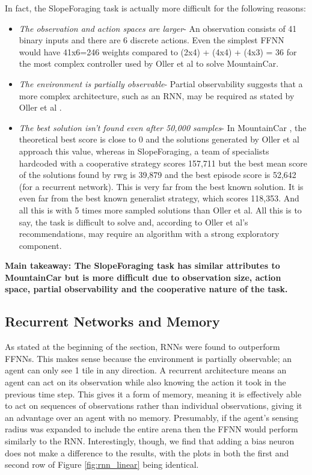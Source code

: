 \documentclass[12pt]{article}
\begin{document}
In fact, the SlopeForaging task is actually more difficult for the following reasons:

\begin{itemize}
\item \textit{The observation and action spaces are larger}- An observation consists of 41 binary inputs and there are 6 discrete actions. 
Even the simplest FFNN would have 41x6=246 weights compared to (2x4) + (4x4) + (4x3) = 36 for the most complex controller used by Oller et al to solve MountainCar. 

\item \textit{The environment is partially observable}- Partial observability suggests that a more complex architecture, such as an RNN, may be required as stated by Oller et al \cite{oller:AAMAS:2020}.

\item \textit{The best solution isn't found even after 50,000 samples}- In MountainCar \cite{MountainCar}, the theoretical best score is close to 0 and the solutions generated by Oller et al approach this value, whereas in SlopeForaging, a team of specialists hardcoded with a cooperative strategy scores 157,711 but the best mean score of the solutions found by rwg is 39,879 and the best episode score is 52,642 (for a recurrent network). 
This is very far from the best known solution. It is even far from the best known generalist strategy, which scores 118,353. 
And all this is with 5 times more sampled solutions than Oller et al. 
All this is to say, the task is difficult to solve and, according to Oller et al's recommendations, may require an algorithm with a strong exploratory component.

\end{itemize}

\textbf{Main takeaway: The SlopeForaging task has similar attributes to MountainCar but is more difficult due to observation size, action space, partial observability and the cooperative nature of the task.}
		
\subsection{Recurrent Networks and Memory} \label{RNN Architecture}

As stated at the beginning of the section, RNNs were found to outperform FFNNs. 
This makes sense because the environment is partially observable; an agent can only see 1 tile in any direction. 
A recurrent architecture means an agent can act on its observation while also knowing the action it took in the previous time step.
This gives it a form of memory, meaning it is effectively able to act on sequences of observations rather than individual observations, giving it an advantage over an agent with no memory. 
Presumably, if the agent's sensing radius was expanded to include the entire arena then the FFNN would perform similarly to the RNN. 
Interestingly, though, we find that adding a bias neuron does not make a difference to the results, with the plots in both the first and second row of Figure \ref{fig:rnn_linear} being identical.\\ 
\end{document}
